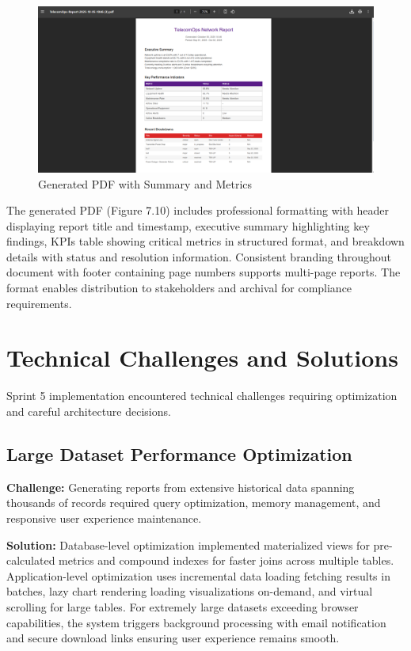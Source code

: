 \begin{figure}[H]
    \centering
    \includegraphics[width=0.9\linewidth]{img/chap_07/screenshot_pdf_sample.png}
    \caption{Generated PDF with Summary and Metrics}
    \label{fig:pdf_sample}
\end{figure}

The generated PDF (Figure 7.10) includes professional formatting with header displaying report title and timestamp, executive summary highlighting key findings, KPIs table showing critical metrics in structured format, and breakdown details with status and resolution information. Consistent branding throughout document with footer containing page numbers supports multi-page reports. The format enables distribution to stakeholders and archival for compliance requirements.

\section{Technical Challenges and Solutions}

Sprint 5 implementation encountered technical challenges requiring optimization and careful architecture decisions.

\subsection{Large Dataset Performance Optimization}

\textbf{Challenge:} Generating reports from extensive historical data spanning thousands of records required query optimization, memory management, and responsive user experience maintenance.

\textbf{Solution:} Database-level optimization implemented materialized views for pre-calculated metrics and compound indexes for faster joins across multiple tables. Application-level optimization uses incremental data loading fetching results in batches, lazy chart rendering loading visualizations on-demand, and virtual scrolling for large tables. For extremely large datasets exceeding browser capabilities, the system triggers background processing with email notification and secure download links ensuring user experience remains smooth.

